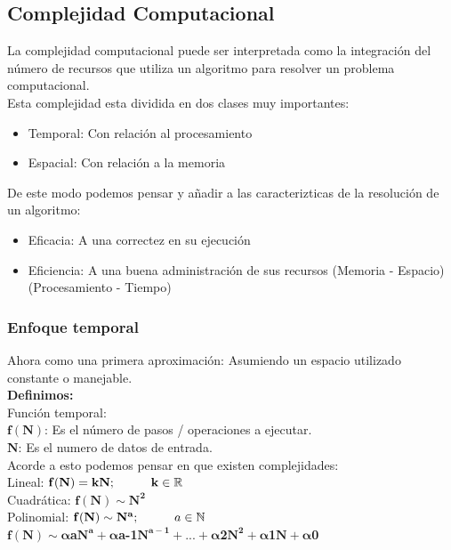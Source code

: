 \documentclass[10pt,executivepaper]{article}
\newcommand\tab[1][1cm]{\hspace*{#1}}
\begin{document}
\subsection{Complejidad Computacional}
La complejidad computacional puede ser interpretada como la integración del número de recursos que utiliza un algoritmo para resolver un problema computacional.\\
Esta complejidad esta dividida en dos clases muy importantes:\\
\begin{itemize}
  \item Temporal: Con relación al procesamiento
  \item Espacial: Con relación a la memoria
\end{itemize}
De este modo podemos pensar y añadir a las caracterizticas de la resolución de un algoritmo:
\begin{itemize}
  \item Eficacia: A una correctez en su ejecución
  \item Eficiencia: A una buena administración de sus recursos (Memoria - Espacio) (Procesamiento - Tiempo)
\end{itemize}
\subsubsection{Enfoque temporal}
Ahora como una primera aproximación: Asumiendo un espacio utilizado constante o manejable.\\
\textbf{Definimos:}\\
Función temporal: \\
\tab $\mathbf{f(N)}$: Es el número de pasos / operaciones a ejecutar.\\
\tab $\mathbf{N}$: Es el numero de datos de entrada.\\
Acorde a esto podemos pensar en que existen complejidades:\\
\tab Lineal: $\mathbf{f(N) = kN; \tab k \in \mathbb{R}}$\\
\tab Cuadrática: $\mathbf{f(N)  \sim {N^2}}$\\
\tab Polinomial: $\mathbf{f(N) \sim {N^a}}; \tab a \in \mathbb{N}$\\
\tab\tab\hspace{0.85cm}\textbf{$\mathbf{f(N) \sim \alpha}${\tiny a}$\mathbf{N^a + \alpha}${\tiny a-1}$\mathbf{N^{a-1} + ... + \alpha}${\tiny 2}$\mathbf{N^2 + \alpha}${\tiny 1}$\mathbf{N + \alpha}${\tiny 0}}
\printindex
\end{document}
